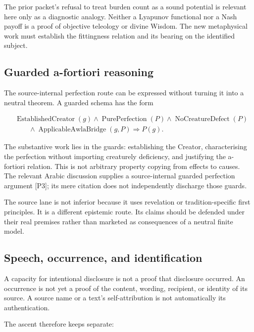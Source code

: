 \documentclass[11pt,a4paper]{article}
\begin{document}
The prior packet's refusal to treat burden count as a sound potential is
relevant here only as a diagnostic analogy. Neither a Lyapunov
functional nor a Nash payoff is a proof of objective teleology or divine
Wisdom. The new metaphysical work must establish the fittingness
relation and its bearing on the identified subject.

\subsection{Guarded a-fortiori
reasoning}\label{guarded-a-fortiori-reasoning}

The source-internal perfection route can be expressed without turning it
into a neutral theorem. A guarded schema has the form

\nopagebreak[4]

\[
\begin{aligned}
&\operatorname{EstablishedCreator}(g)\land
\operatorname{PurePerfection}(P)\land
\operatorname{NoCreatureDefect}(P)\\
&\qquad\land\operatorname{ApplicableAwlaBridge}(g,P)
\Longrightarrow P(g).
\end{aligned}
\]

The substantive work lies in the guards: establishing the Creator,
characterising the perfection without importing creaturely deficiency,
and justifying the a-fortiori relation. This is not arbitrary property
copying from effects to causes. The relevant Arabic discussion supplies
a source-internal guarded perfection argument {[}P3{]}; its mere
citation does not independently discharge those guards.

The source lane is not inferior because it uses revelation or
tradition-specific first principles. It is a different epistemic route.
Its claims should be defended under their real premises rather than
marketed as consequences of a neutral finite model.

\subsection{Speech, occurrence, and
identification}\label{speech-occurrence-and-identification}

A capacity for intentional disclosure is not a proof that disclosure
occurred. An occurrence is not yet a proof of the content, wording,
recipient, or identity of its source. A source name or a text's
self-attribution is not automatically its authentication.

The ascent therefore keeps separate:
\end{document}
